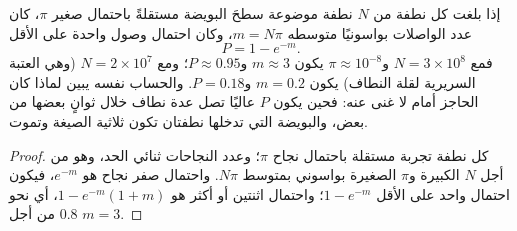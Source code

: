 \begin{theorem}\label{thm:b2:mammal-reproduction:poisson}
إذا بلغت كل نطفة من $N$ نطفة موضوعة سطحَ البويضة
مستقلةً باحتمال صغير $\pi$، كان عدد الواصلات
بواسونيًا متوسطه $m = N\pi$، وكان احتمال وصول واحدة على الأقل
\[
P = 1 - e^{-m}.
\]
فمع $N = 3\times 10^{8}$ و$\pi \approx 10^{-8}$ يكون $m \approx 3$
و$P \approx 0.95$؛ ومع $N = 2\times 10^{7}$ (وهي العتبة
السريرية لقلة النطاف) يكون $m = 0.2$ و$P = 0.18$. والحساب نفسه
يبين لماذا كان الحاجز أمام  لا غنى عنه: فحين يكون
$P$ عاليًا تصل عدة نطاف خلال ثوانٍ بعضها من بعض،
والبويضة التي تدخلها نطفتان تكون ثلاثية الصيغة وتموت.
\end{theorem}
\begin{proof}
كل نطفة تجربة مستقلة باحتمال نجاح $\pi$؛
وعدد النجاحات ثنائي الحد، وهو من أجل $N$ الكبيرة و$\pi$
الصغيرة بواسوني بمتوسط $N\pi$. واحتمال صفر
نجاح هو $e^{-m}$، فيكون احتمال واحد على الأقل $1 - e^{-m}$؛
واحتمال اثنتين أو أكثر هو $1 - e^{-m}(1 + m)$، أي نحو $0.8$ من أجل
$m = 3$.
\end{proof}

